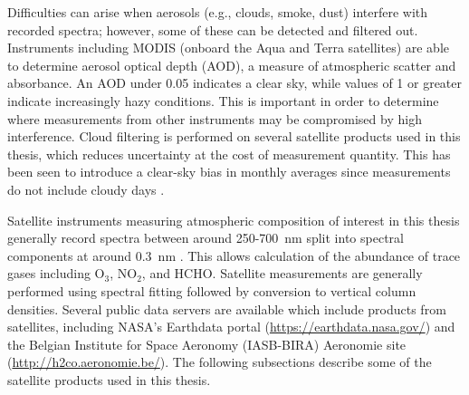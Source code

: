     Difficulties can arise when aerosols (e.g., clouds, smoke, dust) interfere with recorded spectra; however, some of these can be detected and filtered out.
    Instruments including MODIS (onboard the Aqua and Terra satellites) are able to determine aerosol optical depth (AOD), a measure of atmospheric scatter and absorbance. 
    An AOD under 0.05 indicates a clear sky, while values of 1 or greater indicate increasingly hazy conditions.
    This is important in order to determine where measurements from other instruments may be compromised by high interference.
    Cloud filtering is performed on several satellite products used in this thesis, which reduces uncertainty at the cost of measurement quantity. 
    This has been seen to introduce a clear-sky bias in monthly averages since measurements do not include cloudy days \parencite{Surl2018}.
    
    Satellite instruments measuring atmospheric composition of interest in this thesis generally record spectra between around 250-700~nm split into spectral components at around $0.3$~nm \parencite[e.g.,][]{Leue2001}.
    This allows calculation of the abundance of trace gases including O$_3$, NO$_2$, and HCHO.
    Satellite measurements are generally performed using spectral fitting followed by conversion to vertical column densities.
    Several public data servers are available which include products from satellites, including NASA's Earthdata portal (\url{https://earthdata.nasa.gov/}) and the Belgian Institute for Space Aeronomy (IASB-BIRA) Aeronomie site (\url{http://h2co.aeronomie.be/}).
    The following subsections describe some of the satellite products used in this thesis.
    
    
